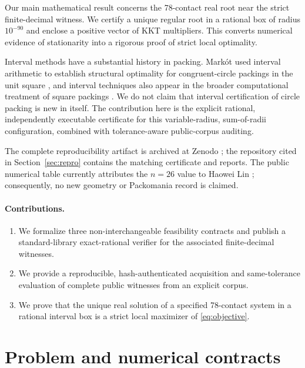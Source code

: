 \documentclass[11pt]{article}
\begin{document}
Our main mathematical result concerns the 78-contact real root near the strict
finite-decimal witness.  We certify a unique regular root in a rational box of
radius $10^{-90}$ and enclose a positive vector of KKT multipliers.  This
converts numerical evidence of stationarity into a rigorous proof of strict
local optimality.

Interval methods have a substantial history in packing.  Mark\'ot used
interval arithmetic to establish structural optimality for congruent-circle
packings in the unit square \cite{markot2007}, and interval techniques also
appear in the broader computational treatment of square packings
\cite{szabo2007}.  We do not claim that interval certification of circle
packing is new in itself.  The contribution here is the explicit rational,
independently executable certificate for this variable-radius, sum-of-radii
configuration, combined with tolerance-aware public-corpus auditing.

The complete reproducibility artifact is archived at Zenodo
\cite{artifact}; the repository cited in Section~\ref{sec:repro} contains the
matching certificate and reports.  The public numerical table currently
attributes the $n=26$ value to Haowei Lin \cite{packomania}; consequently, no
new geometry or Packomania record is claimed.

\paragraph{Contributions.}
\begin{enumerate}
  \item We formalize three non-interchangeable feasibility contracts and
  publish a standard-library exact-rational verifier for the associated
  finite-decimal witnesses.
  \item We provide a reproducible, hash-authenticated acquisition and
  same-tolerance evaluation of complete public witnesses from an explicit
  corpus.
  \item We prove that the unique real solution of a specified 78-contact
  system in a rational interval box is a strict local maximizer of
  \eqref{eq:objective}.
\end{enumerate}

\section{Problem and numerical contracts}                              \label{sec:model}
\end{document}
